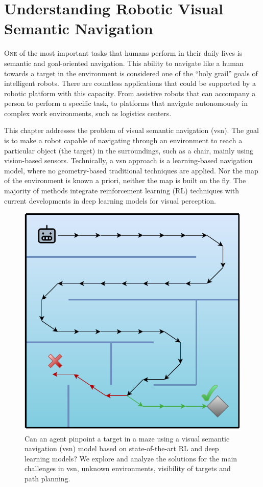 \chapter{Understanding Robotic Visual Semantic Navigation}\label{ch:understanding-robotic-visual-semantic-navigation}

\lettrine{\textcolor{accent_color}{O}}{ne} of the most important tasks that humans perform in their daily lives is semantic and goal-oriented navigation.
This ability to navigate like a human towards a target in the environment is considered one of the ``holy grail'' goals of intelligent robots.
There are countless applications that could be supported by a robotic platform with this capacity.
From assistive robots that can accompany a person to perform a specific task, to platforms that navigate autonomously in complex work environments, such as logistics centers.

This chapter addresses the problem of visual semantic navigation (\acrshort{vsn}).
The goal is to make a robot capable of navigating through an environment to reach a particular object (the target) in the surroundings, such as a chair, mainly using vision-based sensors.
Technically, a \acrshort{vsn} approach is a learning-based navigation model, where no geometry-based traditional techniques are applied.
Nor the map of the environment is known a priori, neither the map is built on the fly.
The majority of methods integrate reinforcement learning (RL) techniques with current developments in deep learning models for visual perception.

\begin{figure}
  \centering
   \includegraphics[width=0.6\linewidth]{figures/understanding_vsn/graphical_abstract}
   \caption{Can an agent pinpoint a target in a maze using a visual semantic navigation (\acrshort{vsn}) model based on state-of-the-art RL and deep learning models? We explore and analyze the solutions for the main challenges in \acrshort{vsn}, \ie unknown environments, visibility of targets and path planning.}
   \label{fig:graphical_abstract}
\end{figure}

